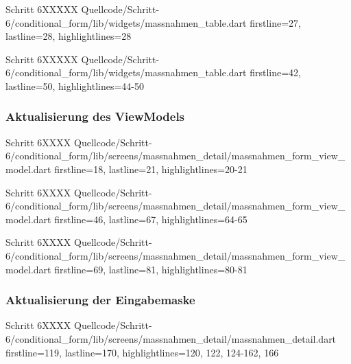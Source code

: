 \begin{alexlisting}{Schritt 6}{XXXXX}
  {Quellcode/Schritt-6/conditional_form/lib/widgets/massnahmen_table.dart}
  {firstline=27, lastline=28, highlightlines={28}}
  \label{lst:Schritt6XXXXX}
\end{alexlisting}

\begin{alexlisting}{Schritt 6}{XXXXX}
  {Quellcode/Schritt-6/conditional_form/lib/widgets/massnahmen_table.dart}
  {firstline=42, lastline=50, highlightlines={44-50}}
  \label{lst:Schritt6XXXXX}
\end{alexlisting}

\subsubsection{Aktualisierung des ViewModels}

\begin{alexlisting}{Schritt 6}{XXXX}
  {Quellcode/Schritt-6/conditional_form/lib/screens/massnahmen_detail/massnahmen_form_view_model.dart}
  {firstline=18, lastline=21, highlightlines={20-21}}
  \label{lst:Schritt6XXXXX}
\end{alexlisting}

\begin{alexlisting}{Schritt 6}{XXXX}
  {Quellcode/Schritt-6/conditional_form/lib/screens/massnahmen_detail/massnahmen_form_view_model.dart}
  {firstline=46, lastline=67, highlightlines={64-65}}
  \label{lst:Schritt6XXXXX}
\end{alexlisting}

\begin{alexlisting}{Schritt 6}{XXXX}
  {Quellcode/Schritt-6/conditional_form/lib/screens/massnahmen_detail/massnahmen_form_view_model.dart}
  {firstline=69, lastline=81, highlightlines={80-81}}
  \label{lst:Schritt6XXXXX}
\end{alexlisting}

\subsubsection{Aktualisierung der Eingabemaske}







  \begin{alexlisting}{Schritt 6}{XXXX}
    {Quellcode/Schritt-6/conditional_form/lib/screens/massnahmen_detail/massnahmen_detail.dart}
    {firstline=119, lastline=170, highlightlines={120, 122, 124-162, 166}}
    \label{lst:Schritt6XXXXX}
  \end{alexlisting}

